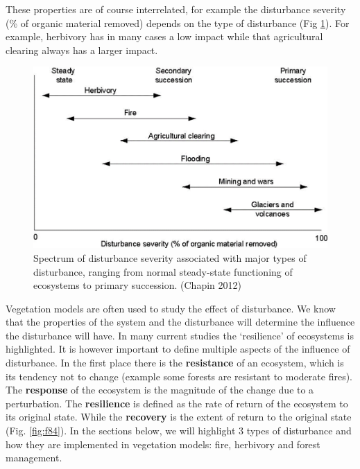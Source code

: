 \documentclass[12pt,oneside]{book}
\begin{document}
These properties are of course interrelated, for example the disturbance
severity (\% of organic material removed) depends on the type of
disturbance (Fig \ref{fig:f83}). For example, herbivory has in many
cases a low impact while that agricultural clearing always has a larger
impact.

\begin{figure}

{\centering \includegraphics[width=0.8\linewidth]{figures/chap8/f83_disturbance_chapin} 

}

\caption{Spectrum of disturbance severity associated with major types of disturbance, ranging from normal steady-state functioning of ecosystems to primary succession. (Chapin 2012)}\label{fig:f83}
\end{figure}

Vegetation models are often used to study the effect of disturbance. We
know that the properties of the system and the disturbance will
determine the influence the disturbance will have. In many current
studies the `resilience' of ecosystems is highlighted. It is however
important to define multiple aspects of the influence of disturbance. In
the first place there is the \textbf{resistance} of an ecosystem, which
is its tendency not to change (example some forests are resistant to
moderate fires). The \textbf{response} of the ecosystem is the magnitude
of the change due to a perturbation. The \textbf{resilience} is defined
as the rate of return of the ecosystem to its original state. While the
\textbf{recovery} is the extent of return to the original state (Fig.
\ref{fig:f84}). In the sections below, we will highlight 3 types of
disturbance and how they are implemented in vegetation models: fire,
herbivory and forest management.
\end{document}
